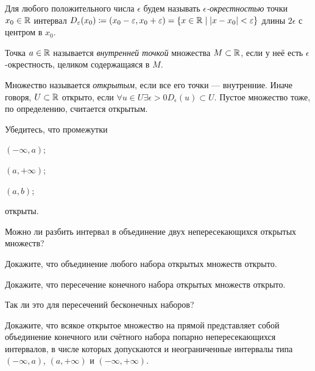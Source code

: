 \documentclass[a4paper, 12pt, num=27]{listok}
\begin{document}
\begin{definition}
	Для любого положительного числа $\epsilon$ будем называть \textit{$\epsilon$-окрестностью} точки $x_0 \in \mathbb{R}$ интервал
	$
		D_{\varepsilon}(x_0) \coloneq \left ( x_0 - \varepsilon, x_0 + \varepsilon \right )
		= \left \{ x \in \mathbb{R} \mid |x - x_0| < \varepsilon \right \}
	$
	длины $2 \epsilon$ с центром в $x_0$.
\end{definition}
\begin{definition}
	Точка $a \in \mathbb{R}$ называется \textit{внутренней точкой} множества $M \subset \mathbb{R}$,
	если у неё есть $\epsilon$-окрестность, целиком содержащаяся в $M$.
\end{definition}
\begin{definition}
	Множество называется \textit{открытым}, если все его точки --- внутренние.
	Иначе говоря, $U \subset \mathbb{R}$ открыто, если
	$\forall{u \in U} \exists{\epsilon > 0} D_{\epsilon}(u) \subset U$.
	Пустое множество тоже, по определению, считается открытым.
\end{definition}
\begin{problem}
	Убедитесь, что промежутки
	\begin{probparts}
		\item $(-\infty, a)$;
		\item $(a, +\infty)$;
		\item $(a, b)$;
	\end{probparts}
	открыты.
\end{problem}
\begin{problem}
	Можно ли разбить интервал в объединение двух непересекающихся открытых множеств?
\end{problem}
\begin{problem}
	Докажите, что объединение любого набора открытых множеств открыто.
\end{problem}
\begin{problem}
	\begin{probparts}
		\item Докажите, что пересечение конечного набора открытых множеств открыто.
		\item Так ли это для пересечений бесконечных наборов?
	\end{probparts}
\end{problem}
\begin{problem}
	Докажите, что всякое открытое множество на прямой представляет собой объединение конечного или счётного набора попарно непересекающихся интервалов,
	в числе которых допускаются и неограниченные интервалы типа $(-\infty, a)$, $(a, +\infty)$ и $(-\infty, +\infty)$.
\end{problem}
\end{document}
